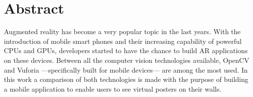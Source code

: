 \chapter{Abstract}
Augmented reality has become a very popular topic in the last years. With
the introduction of mobile smart phones and their increasing capability of
powerful CPUs and GPUs, developers started to have the chance
to build AR applications on these devices. Between all the computer vision
technologies available, OpenCV and Vuforia ---specifically built for mobile
devices--- are among the most used. In this work a comparison of both technologies
is made with the purpose of building a mobile application to enable users to see
virtual posters on their walls.
